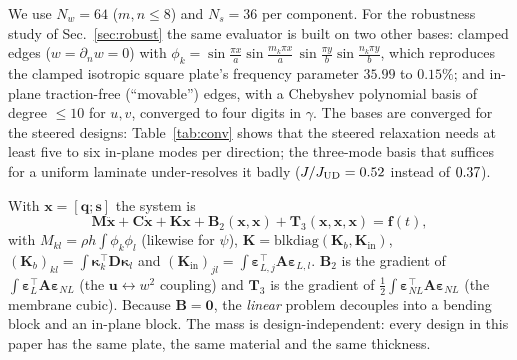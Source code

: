 We use $N_w=64$ ($m,n\le8$) and $N_s=36$ per component. For the robustness study of
Sec.~\ref{sec:robust} the same evaluator is built on two other bases: clamped edges
($w=\partial_nw=0$) with $\phi_k=\sin\tfrac{\pi x}{a}\sin\tfrac{m_k\pi x}{a}\,
\sin\tfrac{\pi y}{b}\sin\tfrac{n_k\pi y}{b}$, which reproduces the clamped isotropic square
plate's frequency parameter $35.99$ to $0.15\%$; and in-plane traction-free (``movable'') edges,
with a Chebyshev polynomial basis of degree $\le10$ for $u,v$, converged to four digits in
$\gamma$. The bases are converged
for the steered designs: Table~\ref{tab:conv} shows that the steered relaxation needs at least
five to six in-plane modes per direction; the three-mode basis that suffices for a uniform
laminate under-resolves it badly ($J/J_{\mathrm{UD}}=0.52$ instead of $0.37$).

\begin{table}[!tbp]
\centering\footnotesize
\caption{Convergence of the evaluator on the reported held-frequency steered design
(generated by \texttt{conv\_table.py}). $J/J_{\UD}$ and the relaxed share are converged on
the bold basis; three in-plane modes per direction under-resolve the steered relaxation.
The steered frequency is a Ritz upper bound that falls by $\nConvFreqDrop\%$ as the transverse basis
grows (the UD frequency does not change), so ``held frequency'' holds to about $\nConvFreqDrop\%$
across bases and $\nHeldTol\%$ against the independent FE model.
Bold: the basis used throughout.}
\label{tab:conv}
\end{table}

With $\bm x=[\bm q;\bm s]$ the system is
\begin{equation}
\bm M\ddot{\bm x}+\bm C\dot{\bm x}+\bm K\bm x+\bm B_2(\bm x,\bm x)+\bm T_3(\bm x,\bm x,\bm x)=\bm f(t),
\label{eq:eom}
\end{equation}
with
$M_{kl}=\rho h\int\phi_k\phi_l$ (likewise for $\psi$),
$\bm K=\mathrm{blkdiag}(\bm K_b,\bm K_{\mathrm{in}})$,
$(\bm K_b)_{kl}=\int\bm\kappa_k^{\!\top}\bm D\bm\kappa_l$ and
$(\bm K_{\mathrm{in}})_{jl}=\int\bm\varepsilon_{L,j}^{\!\top}\bm A\bm\varepsilon_{L,l}$.
$\bm B_2$ is the gradient of $\int\bm\varepsilon_L^{\!\top}\bm A\bm\varepsilon_{NL}$ (the
$\bm u\leftrightarrow w^2$ coupling) and $\bm T_3$ is the gradient of
$\tfrac12\int\bm\varepsilon_{NL}^{\!\top}\bm A\bm\varepsilon_{NL}$ (the membrane cubic).
Because $\bm B=\bm 0$, the \emph{linear} problem decouples into a bending block and an
in-plane block. The mass is design-independent: every design in this paper has the
same plate, the same material and the same thickness.

